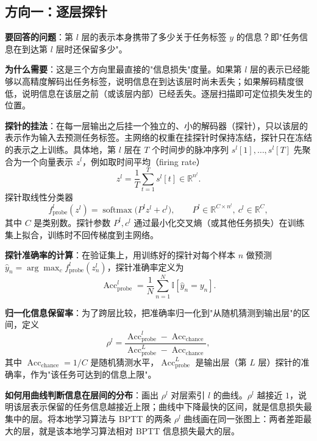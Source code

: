 \documentclass[journal,12pt,onecolumn]{IEEEtran}
\begin{document}
\subsection{方向一：逐层探针}

\textbf{要回答的问题}：第 $l$ 层的表示本身携带了多少关于任务标签 $y$ 的信息？即"任务信息在到达第 $l$ 层时还保留多少"。

\textbf{为什么需要}：这是三个方向里最直接的"信息损失"度量。如果第 $l$ 层的表示已经能够以高精度解码出任务标签，说明信息在到达该层时尚未丢失；如果解码精度很低，说明信息在该层之前（或该层内部）已经丢失。逐层扫描即可定位损失发生的位置。

\textbf{探针的挂法}：在每一层输出之后挂一个独立的、小的解码器（探针），只以该层的表示作为输入去预测任务标签。主网络的权重在挂探针时保持冻结，探针只在冻结的表示之上训练。具体地，第 $l$ 层在 $T$ 个时间步的脉冲序列 $s^l[1],\dots,s^l[T]$ 先聚合为一个向量表示 $z^l$，例如取时间平均（firing rate）
\begin{equation}
z^l = \frac{1}{T}\sum_{t=1}^{T} s^l[t]\in\mathbb R^{n^l}.
\end{equation}
探针取线性分类器
\begin{equation}
f^l_{\mathrm{probe}}(z^l) = \operatorname{softmax}\big(P^l z^l + c^l\big),
\qquad
P^l\in\mathbb R^{C\times n^l},\ c^l\in\mathbb R^C,
\end{equation}
其中 $C$ 是类别数。探针参数 $P^l, c^l$ 通过最小化交叉熵（或其他任务损失）在训练集上拟合，训练时不回传梯度到主网络。

\textbf{探针准确率的计算}：在验证集上，用训练好的探针对每个样本 $n$ 做预测 $\hat y_n = \arg\max_c f^l_{\mathrm{probe}}(z^l_n)$，探针准确率定义为
\begin{equation}
\operatorname{Acc}^l_{\mathrm{probe}} = \frac{1}{N}\sum_{n=1}^{N}\mathbb I[\hat y_n = y_n].
\end{equation}

\textbf{归一化信息保留率}：为了跨层比较，把准确率归一化到"从随机猜测到输出层"的区间，定义
\begin{equation}
\rho^l = \frac{\operatorname{Acc}^l_{\mathrm{probe}} - \operatorname{Acc}_{\mathrm{chance}}}{\operatorname{Acc}^L_{\mathrm{probe}} - \operatorname{Acc}_{\mathrm{chance}}},
\end{equation}
其中 $\operatorname{Acc}_{\mathrm{chance}}=1/C$ 是随机猜测水平，$\operatorname{Acc}^L_{\mathrm{probe}}$ 是输出层（第 $L$ 层）探针的准确率，作为"该任务可达到的信息上限"。

\textbf{如何用曲线判断信息在层间的分布}：画出 $\rho^l$ 对层索引 $l$ 的曲线。$\rho^l$ 越接近 $1$，说明该层表示保留的任务信息越接近上限；曲线中下降最快的区间，就是信息损失最集中的层。将本地学习算法与 BPTT 的两条 $\rho^l$ 曲线画在同一张图上：两者差距最大的层，就是该本地学习算法相对 BPTT 信息损失最大的层。
\end{document}
